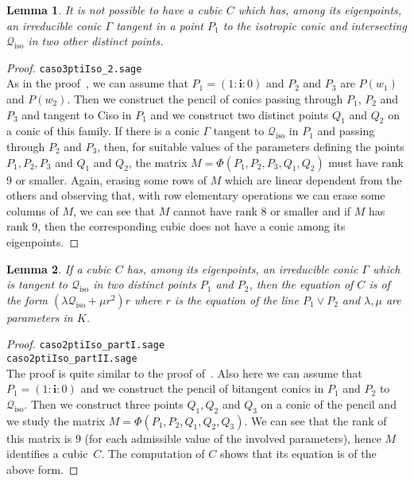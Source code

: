 \documentclass{amsart}
\theoremstyle{plain}
\newtheorem{lemma}{Lemma}[section]
\theoremstyle{definition}
\newcommand{\iso}{\mathcal{Q}_{\mathrm{iso}}}
\newcommand{\iii}{\textbf{i}}
\begin{document}
\begin{lemma}
\label{lemma3ptiSuCiso}
It is not possible to have a cubic $C$ which has, among its eigenpoints,
an irreducible conic $\Gamma$ tangent in a point $P_1$ to the isotropic
conic and intersecting $\iso$ in two other distinct points.
\end{lemma}
\begin{proof}
\verb+caso3ptiIso_2.sage+\\
As in the proof~, we can assume that
$P_1 = (1: \iii: 0)$
and $P_2$ and $P_3$ are $P(w_1)$ and $P(w_2)$. Then we construct
the pencil of conics passing through $P_1$, $P_2$ and $P_3$ and
tangent to Ciso in $P_1$ and we construct two distinct points
$Q_1$ and $Q_2$ on a conic of this family. If there is a conic $\Gamma$
tangent to $\iso$ in $P_1$ and passing through $P_2$ and $P_3$,
then, for suitable values of the parameters defining the points
$P_1, P_2, P_3$ and $Q_1$ and $Q_2$, the matrix
$M = \Phi(P_1, P_2, P_3, Q_1, Q_2)$
must have rank $9$ or smaller. Again, erasing some rows of $M$
which are linear dependent from the others and observing that,
with row elementary operations we can erase some columns of $M$,
we can see that $M$ cannot have rank $8$ or smaller and if $M$
has rank $9$, then the corresponding cubic does not have a conic
among its eigenpoints.
\end{proof}

\begin{lemma}
\label{lemma:bitangentToCiso}
If a cubic $C$ has, among its eigenpoints, an irreducible conic $\Gamma$
which is tangent to $\iso$ in two distinct points $P_1$ and $P_2$, then
the equation of $C$ is of the form $(\lambda \iso + \mu r^2)r$ where
$r$ is the equation of the line $P_1\vee P_2$ and $\lambda, \mu$ are parameters
in $K$.
\end{lemma}
\begin{proof}
\verb+caso2ptiIso_partI.sage+\\
\verb+caso2ptiIso_partII.sage+\\
The proof is quite similar to the proof of~. Also
here we can assume that $P_1 = (1: \iii: 0)$ and we construct the pencil of
bitangent conics in $P_1$ and $P_2$ to $\iso$. Then we construct three
points $Q_1, Q_2$ and $Q_3$ on a conic of the pencil
and we study the matrix $M = \Phi(P_1, P_2, Q_1, Q_2, Q_3)$. We can see
that the rank of this matrix is $9$ (for each admissible value of the
involved parameters), hence $M$ identifies a cubic~$C$. The computation
of $C$ shows that its equation is of the above form.
\end{proof}
\end{document}
